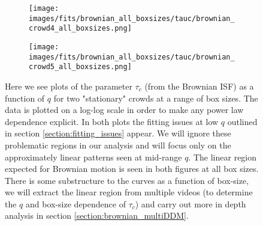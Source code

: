 \documentclass[10pt]{article}
\begin{document}
\begin{figure}[H]
\begin{subfigure}[t]{.5\textwidth}
  \centering
 \texttt{[image: images/fits/brownian\_all\_boxsizes/tauc/brownian\_crowd4\_all\_boxsizes.png]}
  \caption{}
\end{subfigure}%
\hfill
\begin{subfigure}[t]{.5\textwidth}
  \centering
  \texttt{[image: images/fits/brownian\_all\_boxsizes/tauc/brownian\_crowd5\_all\_boxsizes.png]}
  \caption{}
\end{subfigure}
\caption{Here we see plots of the parameter $\tau_c$ (from the Brownian ISF) as a function of $q$ for two "stationary" crowds at a range of box sizes. The data is plotted on a log-log scale in order to make any power law dependence explicit. In both plots the fitting issues at low $q$ outlined in section \ref{section:fitting_issues} appear. We will ignore these problematic regions in our analysis and will focus only on the approximately linear patterns seen at mid-range $q$. The linear region expected for Brownian motion is seen in both figures at all box sizes. There is some substructure to the curves as a function of box-size, we will extract the linear region from multiple videos (to determine the $q$ and box-size dependence of $\tau_c$) and carry out more in depth analysis in section \ref{section:brownian_multiDDM}.}
\label{fig:crowd_brownian_fits_tauc_all_boxsizes}
\end{figure}
\end{document}
